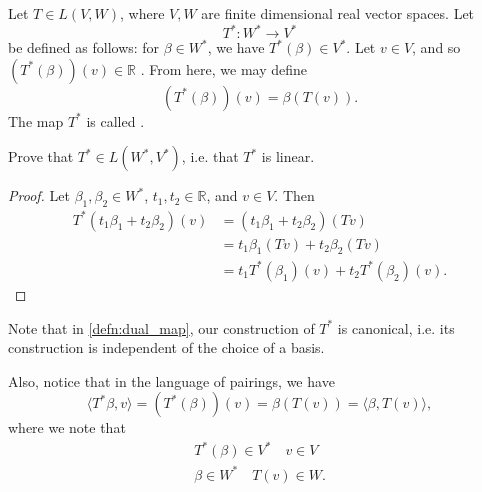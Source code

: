 \documentclass[notoc,notitlepage]{tufte-book}
\begin{document}
\begin{defn}\label{defn:dual_map}
  Let $T \in L(V, W)$, where $V, W$ are finite dimensional real vector spaces. Let
  \begin{equation*}
    T^* : W^* \to V^*
  \end{equation*}
  be defined as follows: for $\beta \in W^*$, we have $T^*(\beta) \in V^*$.
  Let $v \in V$, and so $(T^*(\beta))(v) \in \mathbb{R}$
  .
  From here, we may define
  \begin{equation*}
    (T^*(\beta))(v) = \beta(T(v)).
  \end{equation*}
  The map $T^*$ is called .
\end{defn}

\begin{ex}
  Prove that $T^* \in L(W^*, V^*)$, i.e. that $T^*$ is linear.
\end{ex}

\begin{proof}
  Let $\beta_1, \beta_2 \in W^*$, $t_1, t_2 \in \mathbb{R}$, and $v \in V$.
  Then
  \begin{align*}
    T^*(t_1 \beta_1 + t_2 \beta_2)(v)
      &= (t_1 \beta_1 + t_2 \beta_2)(Tv) \\
      &= t_1 \beta_1 (Tv) + t_2 \beta_2 (Tv) \\
      &= t_1 T^*(\beta_1)(v) + t_2 T^*(\beta_2)(v).
  \end{align*}
\end{proof}

\begin{note}
  Note that in \cref{defn:dual_map}, our construction of $T^*$ is canonical,
  i.e. its construction is independent of the choice of a basis.

  Also, notice that in the language of pairings, we have
  \begin{equation*}
    \langle T^*\beta, v \rangle = (T^*(\beta))(v) = \beta(T(v)) = \langle \beta, T(v) \rangle,
  \end{equation*}
  where we note that
  \begin{gather*}
    T^*(\beta) \in V^* \quad v \in V \\
    \beta \in W^* \quad T(v) \in W.
  \end{gather*}
\end{note}
\end{document}
